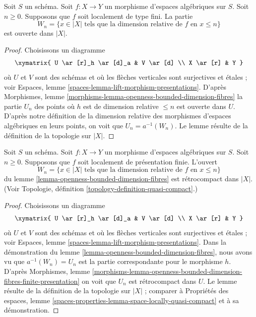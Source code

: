 \begin{lemma}
\label{lemma-openness-bounded-dimension-fibres}
Soit $S$ un schéma.
Soit $f : X \to Y$ un morphisme d'espaces algébriques sur $S$.
Soit $n \geq 0$. Supposons que $f$ soit localement de type fini.
La partie
$$
W_n = \{x \in |X|
\text{ tels que la dimension relative de }f\text{ en } x \leq n\}
$$
est ouverte dans $|X|$.
\end{lemma}

\begin{proof}
Choisissons un diagramme
$$
\xymatrix{
U \ar[r]_h \ar[d]_a & V \ar[d] \\
X \ar[r] & Y
}
$$
où $U$ et $V$ sont des schémas et où les flèches verticales sont surjectives et
étales ; voir
Espaces, lemme \ref{spaces-lemma-lift-morphism-presentations}.
D'après
Morphismes, lemme \ref{morphisms-lemma-openness-bounded-dimension-fibres}
la partie $U_n$ des points où $h$ est de dimension relative
$\leq n$ est ouverte dans $U$. D'après notre définition de la dimension relative
des morphismes d'espaces algébriques en leurs points, on voit que
$U_n = a^{-1}(W_n)$.
Le lemme résulte de la définition de la topologie sur $|X|$.
\end{proof}

\begin{lemma}
\label{lemma-openness-bounded-dimension-fibres-finite-presentation}
Soit $S$ un schéma.
Soit $f : X \to Y$ un morphisme d'espaces algébriques sur $S$.
Soit $n \geq 0$. Supposons que $f$ soit localement de présentation finie.
L'ouvert
$$
W_n = \{x \in |X|
\text{ tels que la dimension relative de }f\text{ en } x \leq n\}
$$
du lemme \ref{lemma-openness-bounded-dimension-fibres}
est rétrocompact dans $|X|$. (Voir
Topologie, définition \ref{topology-definition-quasi-compact}.)
\end{lemma}

\begin{proof}
Choisissons un diagramme
$$
\xymatrix{
U \ar[r]_h \ar[d]_a & V \ar[d] \\
X \ar[r] & Y
}
$$
où $U$ et $V$ sont des schémas et où les flèches verticales sont surjectives et
étales ; voir
Espaces, lemme \ref{spaces-lemma-lift-morphism-presentations}.
Dans la démonstration du
lemme \ref{lemma-openness-bounded-dimension-fibres},
nous avons vu que $a^{-1}(W_n) = U_n$ est la partie correspondante
pour le morphisme $h$. D'après
Morphismes, lemme
\ref{morphisms-lemma-openness-bounded-dimension-fibres-finite-presentation}
on voit que $U_n$ est rétrocompact dans $U$.
Le lemme résulte de la définition de la topologie sur $|X|$ ; comparer à
Propriétés des espaces,
lemme \ref{spaces-properties-lemma-space-locally-quasi-compact}
et à sa démonstration.
\end{proof}

